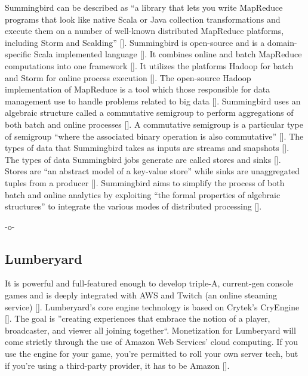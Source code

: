 Summingbird can be described as ``a library that lets you write
MapReduce programs that look like native Scala or Java collection
transformations and execute them on a number of well-known distributed
MapReduce platforms, including Storm and
Scalding'' [\cite{summingbirdgit}]. Summingbird is open-source and is a
domain-specific Scala implemented
language [\cite{boykin2014summingbird}]. It combines online and batch
MapReduce computations into one
framework [\cite{boykin2014summingbird}]. It utilizes the platforms
Hadoop for batch and Storm for online process
execution [\cite{boykin2014summingbird}]. The open-source Hadoop
implementation of MapReduce is a tool which those responsible for data
management use to handle problems related to big
data [\cite{boykin2014summingbird}]. Summingbird uses an algebraic
structure called a commutative semigroup to perform aggregations of
both batch and online processes [\cite{boykin2014summingbird}]. A
commutative semigroup is a particular type of semigroup ``where the
associated binary operation is also
commutative'' [\cite{boykin2014summingbird}].  The types of data that
Summingbird takes as inputs are streams and
snapshots [\cite{boykin2014summingbird}]. The types of data Summingbird
jobs generate are called stores and
sinks [\cite{boykin2014summingbird}]. Stores are ``an abstract model of
a key-value store'' while sinks are unaggregated tuples from a
producer [\cite{boykin2014summingbird}]. Summingbird aims to simplify
the process of both batch and online analytics by exploiting ``the
formal properties of algebraic structures'' to integrate the various
modes of distributed processing [\cite{boykin2014summingbird}].

     -o-
     
\subsection{Lumberyard}
     
It is powerful and full-featured enough to develop triple-A,
current-gen console games and is deeply integrated with AWS and Twitch
(an online steaming service) [\cite{gamasutra}]. Lumberyard's core
engine technology is based on Crytek's CryEngine [\cite{hands}]. The
goal is ''creating experiences that embrace the notion of a player,
broadcaster, and viewer all joining
together``\cite{gamasutra}. Monetization for Lumberyard will come
strictly through the use of Amazon Web Services' cloud computing. If
you use the engine for your game, you're permitted to roll your own
server tech, but if you're using a third-party provider, it has to be
Amazon [\cite{what}].

